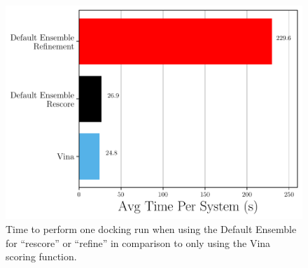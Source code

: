 \documentclass[journal=jcisd8,manuscript=article]{achemso}
\begin{document}
\begin{figure}
    \centering
    \includegraphics{figures/other/refine_timing_comparison.pdf}
    \caption{Time to perform one docking run when using the Default Ensemble for ``rescore'' or ``refine'' in comparison to only using the Vina scoring function.}
    \label{fig:RefineTiming}
\end{figure}
\end{document}
